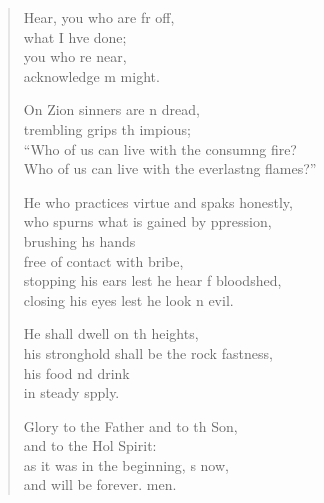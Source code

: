 \settowidth{\versewidth}{Who of us can live with the everlasting flames?”}
\begin{verse}%
  \begin{patverse}
Hear, you who are fr off,\Med\\
what I hve done;\\
you who re near,\Med\\
acknowledge m might.

On Zion sinners are \pointup{\i}n dread,\Med\\
trembling grips th impious;\\
“Who of us can live with the consum\pointup{\i}ng fire?\Med\\
Who of us can live with the everlast\pointup{\i}ng flames?”

He who practices virtue and spaks honestly,\Med\\
who spurns what is gained by ppression,\\
brushing h\pointup{\i}s hands\Med\\
free of contact with  bribe,\\
stopping his ears lest he hear f bloodshed,\Med\\
closing his eyes lest he look n evil.

He shall dwell on th heights,\Med\\
his stronghold shall be the rock fastness,\\
his food nd drink\Med\\
in steady spply.

Glory to the Father and to th Son,\Med\\
and to the Hol Spirit:\\
as it was in the beginning, \pointup{\i}s now,\Med\\
and will be forever. men. 
  \end{patverse}
\end{verse}
